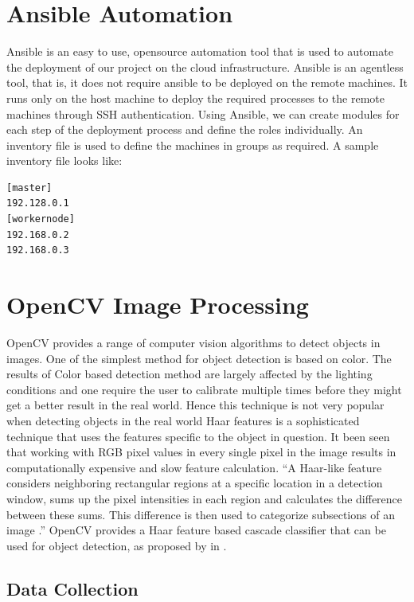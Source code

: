 \documentclass[9pt,twocolumn,twoside]{../../styles/osajnl}
\begin{document}
\section{Ansible Automation}
Ansible is an easy to use, opensource automation tool that is used to automate the deployment of our project on the cloud infrastructure. Ansible is an agentless tool, that is, it does not require ansible to be deployed on the remote machines. It runs only on the host machine to deploy the required processes to the remote machines through SSH authentication.
Using Ansible, we can create modules for each step of the deployment process and define the roles individually. An inventory file is used to define the machines in groups as required. A sample inventory file looks like: 
\begin{verbatim} 
[master] 
192.128.0.1 
[workernode] 
192.168.0.2 
192.168.0.3 
\end{verbatim}

\section{OpenCV Image Processing}

OpenCV provides a range of computer vision algorithms to detect objects in images. One of the simplest method for object detection is based on color. The results of Color based detection method are largely affected by the lighting conditions and one require the user to calibrate multiple times before they might get a better result in the real world. Hence this technique is not very popular when detecting objects in the real world
Haar features is a sophisticated technique that uses the features specific to the object in question. It been seen that working with RGB pixel values in every single pixel in the image results in computationally expensive and slow feature calculation. “A Haar-like feature considers neighboring rectangular regions at a specific location in a detection window, sums up the pixel intensities in each region and calculates the difference between these sums. This difference is then used to categorize subsections of an image \cite{paper-objectdetection}.” OpenCV provides a Haar feature based cascade classifier that can be used for object detection, as proposed by in \cite{paper-ROD}. 

\subsection{Data Collection}
\end{document}
